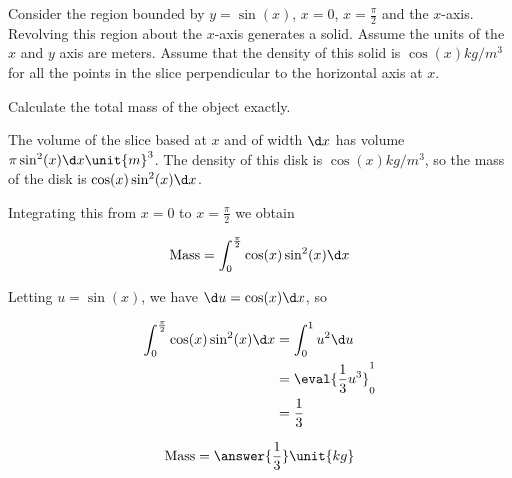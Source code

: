 \documentclass{ximera}
\author{Steven Gubkin}
\begin{document}
\begin{exercise}


Consider the region bounded by $y = \sin(x)$, $x=0$, $x=\frac{\pi}{2}$ and the $x$-axis.  Revolving this region about the $x$-axis generates a solid. Assume the units of the $x$ and $y$ axis are meters.  Assume that the density of this solid is $\cos(x) \unit{kg}/\unit{m}^3$ for all the points in the slice perpendicular to the horizontal axis at $x$.

Calculate the total mass of the object exactly.

\begin{hint}
	The volume of the slice based at $x$ and of width $\d x$ has volume $\pi \sin^2(x) \d x \unit{m}^3$.  The density of this disk is $\cos(x) \unit{kg}/\unit{m}^3$, so the mass of the disk is
	$\cos(x)\sin^2(x) \d x$.
	
	Integrating this from $x=0$ to $x=\frac{\pi}{2}$ we obtain
	
	\[
	\textrm{Mass} = \int_0^\frac{\pi}{2} \cos(x)\sin^2(x) \d x
	\]
\end{hint}


\begin{hint}
	Letting $u = \sin(x)$, we have $\d u = \cos(x) \d x$, so
	
	\begin{align*}
	 \int_0^\frac{\pi}{2} \cos(x)\sin^2(x) \d x &=  \int_0^1 u^2 \d u\\
	 		&=\eval{\frac{1}{3} u^3 }_0^1\\
			&=\frac{1}{3}
	\end{align*}
\end{hint}
\begin{prompt}
	\[
	\textrm{Mass} = \answer{\frac{1}{3}} \unit{kg}
	\]
\end{prompt}

\end{exercise}
\end{document}
